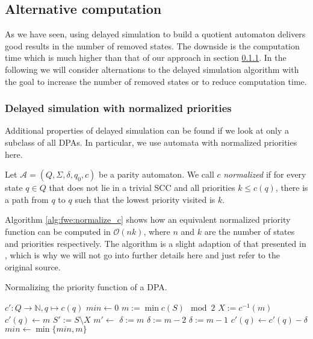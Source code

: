 
\subsection{Alternative computation}
As we have seen, using delayed simulation to build a quotient automaton delivers good results in the number of removed states. The downside is the computation time which is much higher than that of our approach in section \ref{}. In the following we will consider alternations to the delayed simulation algorithm with the goal to increase the number of removed states or to reduce computation time.






\subsubsection{Delayed simulation with normalized priorities}
Additional properties of delayed simulation can be found if we look at only a subclass of all DPAs. In particular, we use automata with normalized priorities here. 

\begin{defn}
	Let $\mathcal{A} = (Q, \Sigma, \delta, q_0, c)$ be a parity automaton. We call $c$ \emph{normalized} if for every state $q \in Q$ that does not lie in a trivial SCC and all priorities $k \leq c(q)$, there is a path from $q$ to $q$ such that the lowest priority visited is $k$.
\end{defn}

Algorithm \ref{alg:fwe:normalize_c} shows how an equivalent normalized priority function can be computed in $\mathcal{O}(nk)$, where $n$ and $k$ are the number of states and priorities respectively. The algorithm is a slight adaption of that presented in \cite{}, which is why we will not go into further details here and just refer to the original source.

\begin{algorithm}
  \caption{Normalizing the priority function of a DPA.}
  \label{alg:fwe:normalize_c}
  \begin{algorithmic}[1]
      \State $c' : Q \rightarrow \mathbb{N}, q \mapsto c(q)$
      \State {}
      \State {}
    \EndFunction
    \Statex
        \State {}
      \EndIf
      \State $min \gets 0$
        \State $m := \min c(S) \mod 2$
        \State $X := c^{-1}(m)$
          \State $c'(q) \gets m$
        \EndFor
        \State $S' := S \setminus X$
        \State $m' \gets $
            \State $\delta := m$
          \Else
            \State $\delta := m-2$
          \EndIf
        \Else
          \State $\delta := m-1$
        \EndIf
          \State $c'(q) \gets c'(q) - \delta$
        \EndFor
        \State $min \gets \min \{min, m\}$
      \EndFor
      \State {}
    \EndFunction
  \end{algorithmic}
\end{algorithm}


